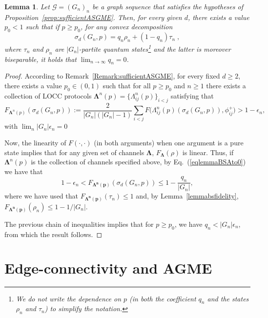 \documentclass[a4paper,onecolumn,accepted=2024-12-14]{quantumarticle}
\newtheorem{lemma}[theorem]{Lemma}
\theoremstyle{plain}
\newcommand{\cG}{{\mathcal G}}         %
\begin{document}
\begin{lemma}\label{lemmaBSAto0}
Let $\cG=(G_n)_n$ be a graph sequence that satisfies the hypotheses of
Proposition~\ref{prop:sufficientASGME}. Then, for every given $d$, there exists a value $p_0<1$ such that if $p\geq p_0$, for any convex decomposition
\begin{equation}\label{eqlemmaBSAto0}
\sigma_d(G_n,p)=q_n\rho_n+(1-q_n)\tau_n\;,
\end{equation}
where $\tau_n$ and $\rho_n$ are $|G_n|$-partite quantum states\footnote{
We do not write the dependence on $p$ (in both the coefficient $q_n$ and the states $\rho_n$ and $\tau_n$) to simplify the notation.} and the latter is moreover biseparable, it holds that $\lim_{n\to\infty} q_n=0$.
\end{lemma}
\begin{proof}
According to Remark~\ref{Remark:sufficientASGME}, for every fixed $d\geq 2$, there exists a value $p_0\in (0,1)$ such that for all $p\geq p_0$ and $n\geq 1$ there exists a collection of LOCC protocols $\mathbf{\Lambda}^n(p)=\{\Lambda_{ij}^n(p)\}_{i<j}$ satisfying that
\begin{equation}\label{fidelitylambda_remark}
F_{\mathbf{\Lambda}^n(p)}(\sigma_d(G_n,p)):=\frac{2}{|G_n|(|G_n|-1)}\sum_{i<j}
F\Big(\Lambda_{ij}^n(p)(\sigma_d(G_n,p)),\phi_{ij}^{+}\Big)> 1-\epsilon_n,
\end{equation}
with $\lim_n |G_n|\epsilon_n=0$


Now, the linearity of
$F(\cdot,\cdot)$ (in both arguments) when one argument is a pure state implies that for any given set of channels $\mathbf{\Lambda}$, $F_\mathbf{\Lambda}(\rho)$ is linear. Thus, if $\mathbf{\Lambda}^n(p)$ is the collection of channels specified above, by Eq.\ (\ref{eqlemmaBSAto0}) we have that
\begin{equation}
1- \epsilon_n< F_\mathbf{\mathbf{\Lambda}^n(p)}(\sigma_d(G_n,p))\leq1-\frac{q_n}{|G_n|},
\end{equation}
where we have used that $F_\mathbf{\mathbf{\Lambda}^n(p)}(\tau_n)\leq1$ and, by Lemma~\ref{lemmabsfidelity}, $F_\mathbf{\mathbf{\Lambda}^n(p)}(\rho_n)\leq1-1/|G_n|$.

The previous chain of inequalities implies that for $p\geq p_0$, we have
$q_n< |G_n|\epsilon_n$, from which the result follows.
\end{proof}



\section{Edge-connectivity and AGME}\label{seccon}
\end{document}
